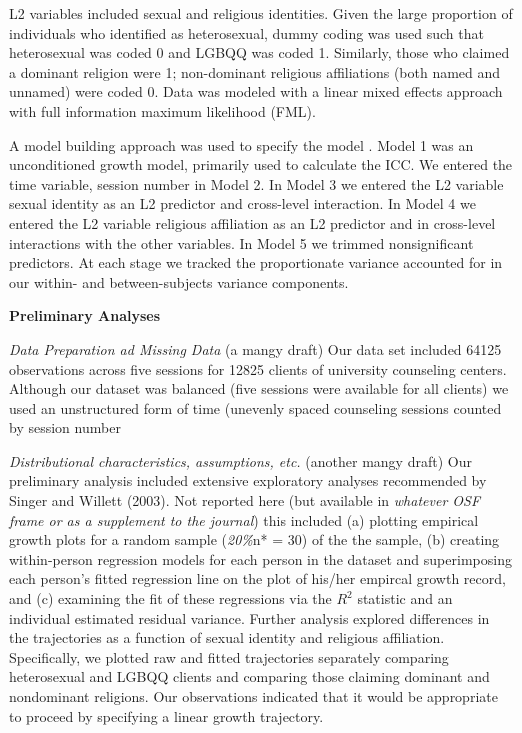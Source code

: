 \documentclass[
  11pt,
]{book}
\begin{document}
L2 variables included sexual and religious identities. Given the large proportion of individuals who identified as heterosexual, dummy coding was used such that heterosexual was coded 0 and LGBQQ was coded 1. Similarly, those who claimed a dominant religion were 1; non-dominant religious affiliations (both named and unnamed) were coded 0. Data was modeled with a linear mixed effects approach with full information maximum likelihood (FML).

A model building approach was used to specify the model \citep{hancock_hierarchical_2010, singer_applied_2003}. Model 1 was an unconditioned growth model, primarily used to calculate the ICC. We entered the time variable, session number in Model 2. In Model 3 we entered the L2 variable sexual identity as an L2 predictor and cross-level interaction. In Model 4 we entered the L2 variable religious affiliation as an L2 predictor and in cross-level interactions with the other variables. In Model 5 we trimmed nonsignificant predictors. At each stage we tracked the proportionate variance accounted for in our within- and between-subjects variance components.

\textbf{Preliminary Analyses}

\emph{Data Preparation ad Missing Data} (a mangy draft) Our data set included 64125 observations across five sessions for 12825 clients of university counseling centers. Although our dataset was balanced (five sessions were available for all clients) we used an unstructured form of time (unevenly spaced counseling sessions counted by session number

\emph{Distributional characteristics, assumptions, etc.} (another mangy draft) Our preliminary analysis included extensive exploratory analyses recommended by Singer and Willett (2003). Not reported here (but available in \emph{whatever OSF frame or as a supplement to the journal}) this included (a) plotting empirical growth plots for a random sample (\emph{20\%}n* = 30) of the the sample, (b) creating within-person regression models for each person in the dataset and superimposing each person's fitted regression line on the plot of his/her empircal growth record, and (c) examining the fit of these regressions via the \(R^2\) statistic and an individual estimated residual variance. Further analysis explored differences in the trajectories as a function of sexual identity and religious affiliation. Specifically, we plotted raw and fitted trajectories separately comparing heterosexual and LGBQQ clients and comparing those claiming dominant and nondominant religions. Our observations indicated that it would be appropriate to proceed by specifying a linear growth trajectory.
\end{document}
